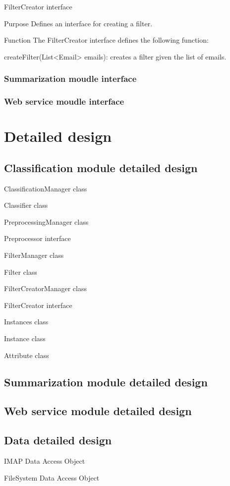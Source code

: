\documentclass[12pt]{article}
\newenvironment{my_itemize}
{\begin{itemize}
  \setlength{\itemsep}{0cm}
  \setlength{\parskip}{0cm}}
{\end{itemize}}
\newenvironment{my_desc}
{\begin{description}
  \setlength{\itemsep}{0cm}
  \setlength{\parskip}{0cm}}
{\end{description}}
\begin{document}
\begin{my_itemize}
  \item FilterCreator interface
  \begin{my_desc}
   \item[Purpose] Defines an interface for creating a filter.
   \item[Function] The FilterCreator interface defines the following function:
	\begin{my_itemize}
	\item createFilter(List<Email> emails): creates a filter given the list of emails.
	\end{my_itemize}
  \end{my_desc}

\end{my_itemize}

\subsubsection{Summarization moudle interface}
\subsubsection{Web service moudle interface}

\section{Detailed design}

\subsection{Classification module detailed design}

\begin{my_itemize}
  \item ClassificationManager class
  \item Classifier class
  \item PreprocessingManager class
  \item Preprocessor interface
  \item FilterManager class
  \item Filter class
  \item FilterCreatorManager class
  \item FilterCreator interface
  \item Instances class
  \item Instance class
  \item Attribute class
\end{my_itemize}


\subsection{Summarization module detailed design}
\subsection{Web service module detailed design}
\subsection{Data detailed design}

\begin{my_itemize}
  \item IMAP Data Access Object
  \item FileSystem Data Access Object
\end{my_itemize}
\end{document}
